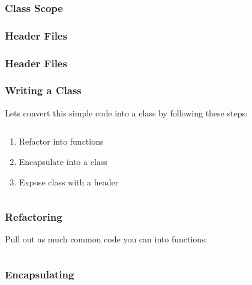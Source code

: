 \begin{frame}[fragile]
	\frametitle{Class Scope}
	
\end{frame}

\begin{frame}
	\frametitle{Header Files}
\end{frame}

\begin{frame}
	\frametitle{Header Files}
	
	
\end{frame}

\begin{frame}[fragile]
	\frametitle{Writing a Class}
	Lets convert this simple code into a class by following these steps:
	\begin{columns}[T]
		\begin{column}{0.5\textwidth}
			\begin{enumerate}
				\item Refactor into functions
				\bigskip
				\item Encapsulate into a class
				\bigskip
				\item Expose class with a header
			\end{enumerate}
		\end{column}
		\begin{column}{0.5\textwidth}
			
		\end{column}
	\end{columns}
\end{frame}

\begin{frame}[fragile]
	\frametitle{Refactoring}
	Pull out as much common code you can into functions:
	\begin{columns}[T]
		\begin{column}{0.5\textwidth}
		
		\end{column}
		\begin{column}{0.5\textwidth}
			
		\end{column}
	\end{columns}
\end{frame}

\begin{frame}[fragile]
	\frametitle{Encapsulating}
	
\end{frame}

